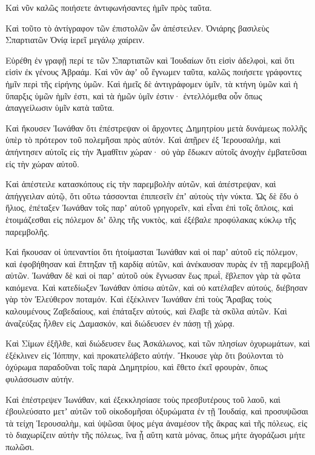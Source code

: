{Καὶ νῦν καλῶς ποιήσετε ἀντιφωνήσαντες ἡμῖν πρὸς ταῦτα.
\par }{\PP {}Καὶ τοῦτο τὸ ἀντίγραφον τῶν ἐπιστολῶν ὧν ἀπέστειλεν. Ὀνιάρης
βασιλεὺς Σπαρτιατῶν Ὀνίᾳ ἱερεῖ μεγάλῳ χαίρειν.
\par }{\PP {}Εὑρέθη ἐν γραφῇ περί τε τῶν Σπαρτιατῶν καὶ Ἰουδαίων ὅτι εἰσὶν ἀδελφοὶ, καὶ ὅτι εἰσὶν ἐκ γένους Ἁβραάμ.
Καὶ νῦν ἀφʼ οὗ ἔγνωμεν ταῦτα, καλῶς ποιήσετε γράφοντες ἡμῖν περὶ τῆς εἰρήνης ὑμῶν.
Καὶ ἡμεῖς δὲ ἁντιγράφομεν ὑμῖν, τὰ κτήνη ὑμῶν καὶ ἡ ὕπαρξις ὑμῶν ἡμῖν ἐστι, καὶ τὰ ἡμῶν ὑμῖν ἐστιν· ἐντελλόμεθα οὖν ὅπως ἀπαγγείλωσιν ὑμῖν κατὰ ταῦτα.
\par }{\PP {}Καὶ ἤκουσεν Ἰωνάθαν ὅτι ἐπέστρεψαν οἱ ἄρχοντες Δημητρίου μετὰ δυνάμεως πολλῆς ὑπὲρ τὸ πρότερον τοῦ πολεμῆσαι πρὸς αὐτόν.
Καὶ ἀπῇρεν ἐξ Ἱερουσαλὴμ, καὶ ἀπήντησεν αὐτοῖς εἰς τὴν Ἀμαθῖτιν χώραν· οὐ γὰρ ἔδωκεν αὐτοῖς ἀνοχὴν ἐμβατεῦσαι εἰς τὴν χώραν αὐτοῦ.
\par }{\PP {}Καὶ ἀπέστειλε κατασκόπους εἰς τὴν παρεμβολὴν αὐτῶν, καὶ ἀπέστρεψαν, καὶ ἀπήγγειλαν αὐτῷ, ὅτι οὕτω τάσσονται ἐπιπεσεῖν ἐπʼ αὐτοὺς τὴν νύκτα.
Ὡς δὲ ἔδυ ὁ ἥλιος, ἐπέταξεν Ἰωνάθαν τοῖς παρʼ αὐτοῦ γρηγορεῖν, καὶ εἶναι ἐπὶ τοῖς ὅπλοις, καὶ ἑτοιμάζεσθαι εἰς πόλεμον διʼ ὅλης τῆς νυκτὸς, καὶ ἐξέβαλε προφύλακας κύκλῳ τῆς παρεμβολῆς.
\par }{\PP {}Καὶ ἤκουσαν οἱ ὑπεναντίοι ὅτι ἡτοίμασται Ἰωνάθαν καὶ οἱ παρʼ αὐτοῦ εἰς πόλεμον, καὶ ἐφοβήθησαν καὶ ἔπτηξαν τῇ καρδίᾳ αὐτῶν, καὶ ἀνέκαυσαν πυρὰς ἐν τῇ παρεμβολῇ αὐτῶν.
Ἰωνάθαν δὲ καὶ οἱ παρʼ αὐτοῦ οὐκ ἔγνωσαν ἕως πρωῒ, ἔβλεπον γὰρ τὰ φῶτα καιόμενα.
Καὶ κατεδίωξεν Ἰωνάθαν ὀπίσω αὐτῶν, καὶ οὐ κατέλαβεν αὐτούς, διέβησαν γὰρ τὸν Ἐλεύθερον ποταμόν.
Καὶ ἐξέκλινεν Ἰωνάθαν ἐπὶ τοὺς Ἄραβας τοὺς καλουμένους Ζαβεδαίους, καὶ ἐπάταξεν αὐτούς, καὶ ἔλαβε τὰ σκῦλα αὐτῶν.
Καὶ ἀναζεύξας ἦλθεν εἰς Δαμασκόν, καὶ διώδευσεν ἐν πάσῃ τῇ χώρᾳ.
\par }{\PP {}Καὶ Σίμων ἐξῆλθε, καὶ διώδευσεν ἕως Ἀσκάλωνος, καὶ τῶν πλησίων ὀχυρωμάτων, καὶ ἐξέκλινεν εἰς Ἰόππην, καὶ προκατελάβετο αὐτήν.
Ἤκουσε γὰρ ὅτι βούλονται τὸ ὀχύρωμα παραδοῦναι τοῖς παρὰ Δημητρίου, καὶ ἔθετο ἐκεῖ φρουρὰν, ὅπως φυλάσσωσιν αὐτήν.
\par }{\PP {}Καὶ ἐπέστρεψεν Ἰωνάθαν, καὶ ἐξεκκλησίασε τοὺς πρεσβυτέρους τοῦ λαοῦ, καὶ ἐβουλεύσατο μετʼ αὐτῶν τοῦ οἰκοδομῆσαι ὀξυρώματα ἐν τῇ Ἰουδαίᾳ,
καὶ προσυψῶσαι τὰ τείχη Ἱερουσαλὴμ, καὶ ὑψῶσαι ὕψος μέγα ἀναμέσον τῆς ἄκρας καὶ τῆς πόλεως, εἰς τὸ διαχωρίζειν αὐτὴν τῆς πόλεως, ἵνα ᾖ αὕτη κατὰ μόνας, ὅπως μήτε ἀγοράζωσι μήτε πωλῶσι.
}
